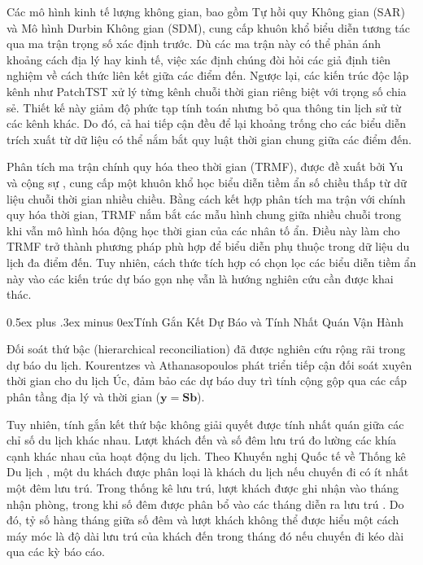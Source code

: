 \documentclass[10pt,journal,compsoc]{IEEEtran}
\makeatletter
\def\subsection{\@startsection{subsection}{2}{\z@}{-1.8ex plus -0.6ex minus -0.3ex}%
{0.5ex plus .3ex minus 0ex}{\normalfont\normalsize\rmfamily\bfseries}}
\makeatother
\begin{document}
Các mô hình kinh tế lượng không gian, bao gồm Tự hồi quy Không gian (SAR) và Mô hình Durbin Không gian (SDM), cung cấp khuôn khổ biểu diễn tương tác qua ma trận trọng số xác định trước. Dù các ma trận này có thể phản ánh khoảng cách địa lý hay kinh tế, việc xác định chúng đòi hỏi các giả định tiên nghiệm về cách thức liên kết giữa các điểm đến. Ngược lại, các kiến trúc độc lập kênh như PatchTST \cite{nie2023patchtst} xử lý từng kênh chuỗi thời gian riêng biệt với trọng số chia sẻ. Thiết kế này giảm độ phức tạp tính toán nhưng bỏ qua thông tin lịch sử từ các kênh khác. Do đó, cả hai tiếp cận đều để lại khoảng trống cho các biểu diễn trích xuất từ dữ liệu có thể nắm bắt quy luật thời gian chung giữa các điểm đến.

Phân tích ma trận chính quy hóa theo thời gian (TRMF), được đề xuất bởi Yu và cộng sự \cite{yu2016trmf}, cung cấp một khuôn khổ học biểu diễn tiềm ẩn số chiều thấp từ dữ liệu chuỗi thời gian nhiều chiều. Bằng cách kết hợp phân tích ma trận với chính quy hóa thời gian, TRMF nắm bắt các mẫu hình chung giữa nhiều chuỗi trong khi vẫn mô hình hóa động học thời gian của các nhân tố ẩn. Điều này làm cho TRMF trở thành phương pháp phù hợp để biểu diễn phụ thuộc trong dữ liệu du lịch đa điểm đến. Tuy nhiên, cách thức tích hợp có chọn lọc các biểu diễn tiềm ẩn này vào các kiến trúc dự báo gọn nhẹ vẫn là hướng nghiên cứu cần được khai thác.

\subsection{Tính Gắn Kết Dự Báo và Tính Nhất Quán Vận Hành}

Đối soát thứ bậc (hierarchical reconciliation) đã được nghiên cứu rộng rãi trong dự báo du lịch. Kourentzes và Athanasopoulos \cite{kourentzes2019coherent} phát triển tiếp cận đối soát xuyên thời gian cho du lịch Úc, đảm bảo các dự báo duy trì tính cộng gộp qua các cấp phân tầng địa lý và thời gian ($\mathbf{y} = \mathbf{S}\mathbf{b}$).

Tuy nhiên, tính gắn kết thứ bậc không giải quyết được tính nhất quán giữa các chỉ số du lịch khác nhau. Lượt khách đến và số đêm lưu trú đo lường các khía cạnh khác nhau của hoạt động du lịch. Theo Khuyến nghị Quốc tế về Thống kê Du lịch \cite{unwto2010recommendations}, một du khách được phân loại là khách du lịch nếu chuyến đi có ít nhất một đêm lưu trú. Trong thống kê lưu trú, lượt khách được ghi nhận vào tháng nhận phòng, trong khi số đêm được phân bổ vào các tháng diễn ra lưu trú \cite{eurostat_tourism_release}. Do đó, tỷ số hàng tháng giữa số đêm và lượt khách không thể được hiểu một cách máy móc là độ dài lưu trú của khách đến trong tháng đó nếu chuyến đi kéo dài qua các kỳ báo cáo.
\end{document}

